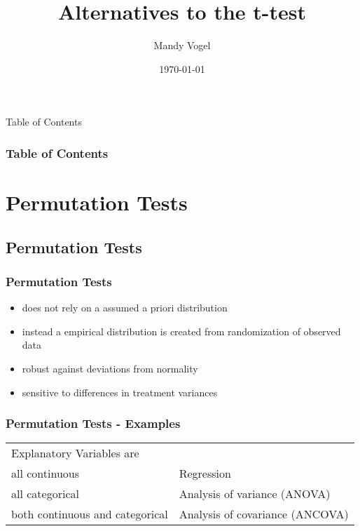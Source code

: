\documentclass[xcolor={table},handout]{beamer}
\begin{document}
\title{Alternatives to the t-test}   
\author{Mandy Vogel} 
\date{\today}


\begin{frame}
\titlepage
\end{frame}

\begin{frame}{Table of Contents}
\frametitle{Table of Contents}\tableofcontents
\end{frame}

\section{Permutation Tests}
\subsection{Permutation Tests}
\begin{frame}\frametitle{Permutation Tests}
\begin{itemize}
\item does not rely on a assumed a priori distribution
\item instead a empirical distribution is created from randomization of observed data
\item robust against deviations from normality
\item sensitive to differences in treatment variances
\end{itemize}
\end{frame}

\begin{frame}\frametitle{Permutation Tests - Examples}
\begin{center}\small
  \begin{tabular}{@{} >{\ttfamily}l l} 
    \rowcolor{gray!40}
Explanatory Variables are & \\
all  continuous                  & Regression                     \\ 
all categorical & Analysis of variance (ANOVA)   \\
both continuous and categorical & Analysis of covariance (ANCOVA)\\
  \end{tabular}
\end{center}
\end{frame}
\end{document}
